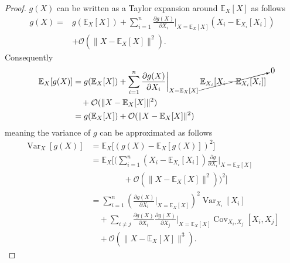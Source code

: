 \begin{proof}
	$g(X)$ can be written as a Taylor expansion around $\mathbb{E}_X[X]$ as follows
	\begin{equation}
		\begin{split}
			g(X) = &g(\mathbb{E}_X[X]) + \sum_{i=1}^n  \frac{\partial g(X)}{\partial X_i} \bigg|_{X = \mathbb{E}_X[X]} (X_i - \mathbb{E}_{X_i}[X_i])\\
			& + \mathcal{O}(\|X - \mathbb{E}_X[X]\|^2).
		\end{split}
		\label{e1}
	\end{equation}
	Consequently
	\begin{equation}
		\begin{split}
			\mathbb{E}_X[g(X)] &= g(\mathbb{E}_X[X])+ \sum_{i=1}^n \frac{\partial g(X)}{\partial X_i} \bigg|_{X = \mathbb{E}_X[X]}\, \cancelto{0}{\mathbb{E}_{X_i}[X_i - \mathbb{E}_{X_i}[X_i]]}\\
			&\quad  + \mathcal{O}(\|X - \mathbb{E}_X[X]\|^2)\\
			& = g(\mathbb{E}_X[X]) + \mathcal{O}(\|X - \mathbb{E}_X[X]\|^2)\\
		\end{split}
		\label{e2}
	\end{equation}
	meaning the variance of $g$ can be approximated as follows
	\begin{equation}
		\begin{split}
			\operatorname{Var}_X[g(X)] &= \mathbb{E}_X\big[(g(X) - \mathbb{E}_X[g(X)])^2\big] \\
			&= \mathbb{E}_X\bigg[\bigg( \sum_{i=1}^n (X_i - \mathbb{E}_{X_i}[X_i]) \frac{\partial g}{\partial X_i}\bigg|_{X=\mathbb{E}_X[X]}\\
			&\qquad\qquad + \mathcal{O}(\|X - \mathbb{E}_X[X]\|^2)\bigg)^2\bigg] \\
			&= \sum_{i=1}^n \left(\frac{\partial g(X)}{\partial X_i}\bigg|_{X = \mathbb{E}_X[X]}\right)^{\!2} \operatorname{Var}_{X_i}[X_i]
			\\&\quad+ \sum_{i \neq j} \frac{\partial g(X)}{\partial X_i}\frac{\partial g(X)}{\partial X_j}\bigg|_{X = \mathbb{E}_X[X]} \operatorname{Cov}_{X_i,X_j}[X_i, X_j]\\
			&\quad+ \mathcal{O}(\|X - \mathbb{E}_X[X]\|^3).
		\end{split}
	\end{equation}
\end{proof}

